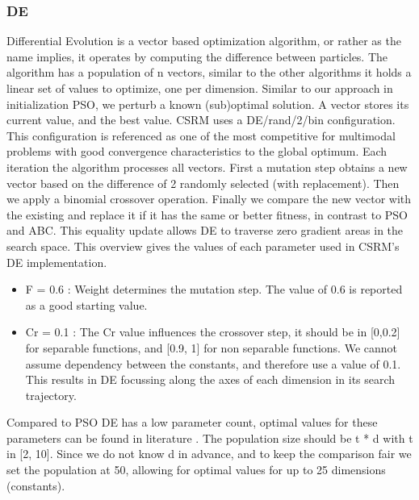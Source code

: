 \subsubsection{DE}
Differential Evolution is a vector based optimization algorithm, or rather as the name implies, it operates by computing the difference between particles. The algorithm has a population of n vectors, similar to the other algorithms it holds a linear set of values to optimize, one per dimension. Similar to our approach in initialization PSO, we perturb a known (sub)optimal solution. A vector stores its current value, and the best value. CSRM uses a DE/rand/2/bin configuration. This configuration is referenced \cite{DE} as one of the most competitive for multimodal problems with good convergence characteristics to the global optimum. Each iteration the algorithm processes all vectors. First a mutation step obtains a new vector based on the difference of 2 randomly selected (with replacement). Then we apply a binomial crossover operation. Finally we compare the new vector with the existing and replace it if it has the same or better fitness, in contrast to PSO and ABC. This equality update allows DE to traverse zero gradient areas in the search space.
This overview gives the values of each parameter used in CSRM's DE implementation.
\begin{itemize}
\item F = 0.6 : Weight determines the mutation step. The value of 0.6 is reported as a good starting value\citep{DESurveyLatest}. 
\item Cr = 0.1 : The Cr value influences the crossover step, it should be in [0,0.2] for separable functions, and [0.9, 1] for non separable functions. We cannot assume dependency between the constants, and therefore use a value of 0.1. This results in DE focussing along the axes of each dimension in its search trajectory. 
\end{itemize}
Compared to PSO DE has a low parameter count, optimal values for these parameters can be found in literature \cite{DESurveyLatest}. The population size should be t * d with t in [2, 10]. Since we do not know d in advance, and to keep the comparison fair we set the population at 50, allowing for optimal values for up to 25 dimensions (constants).